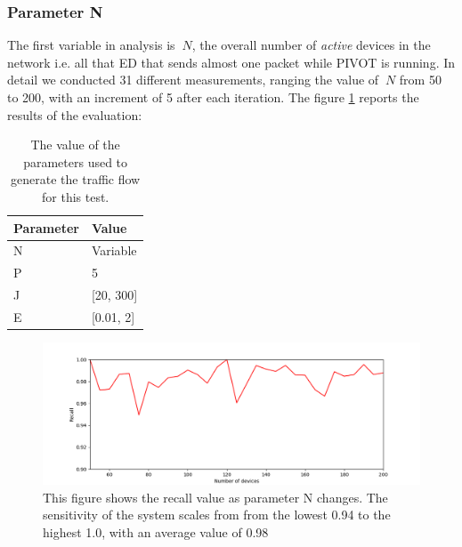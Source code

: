\vspace{3mm}

\subsubsection{Parameter N}
The first variable in analysis is \(\ N \), the overall number of \textit{active} devices in the network i.e. all that ED that sends almost one packet while PIVOT is running. In detail we conducted 31 different measurements, ranging the value of \(\ N \) from 50 to 200, with an increment of 5 after each iteration. The figure \ref{fig:testn} reports the results of the evaluation:

\vspace{3mm}
\begin{table}[H]
\centering
\caption{The value of the parameters used to generate the traffic flow for this test.}
\label{tab:parameter_N}
\begin{tabular}{|l|l|}
\hline
\multicolumn{1}{|c|}{\textbf{Parameter}} & \textbf{Value} \\ \hline
N                                        & Variable            \\ \hline
P                                        & 5              \\ \hline
J                                     & [20, 300]             \\ \hline
E                                     & [0.01, 2]           \\ \hline
\end{tabular}
\end{table}
\vspace{3mm}

\vspace{3mm}
\begin{figure}[H]
    \centering
    \includegraphics[width=1\linewidth]{images/implementation/N.png}
    \caption{This figure shows the recall value as parameter N changes. The sensitivity of the system scales from from the lowest 0.94 to the highest 1.0, with an average value of 0.98}
    \label{fig:testn}
\end{figure}
\vspace{3mm}

